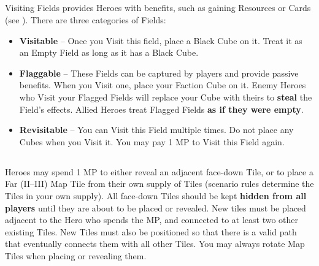 \begin{multicols}{2}

\subsection*{}
Visiting Fields provides Heroes with benefits, such as gaining Resources or Cards (see ).
There are three categories of Fields:
\begin{itemize}
  \item \textbf{Visitable} – Once you Visit this field, place a Black Cube on it.
    Treat it as an Empty Field as long as it has a Black Cube.
  \item \textbf{Flaggable} – These Fields can be captured by players and provide passive benefits.
    When you Visit one, place your Faction Cube on it.
    Enemy Heroes who Visit your Flagged Fields will replace your Cube with theirs to \textbf{steal} the Field’s effects.
    Allied Heroes treat Flagged Fields \textbf{as if they were empty}.
  \item \textbf{Revisitable} – You can Visit this Field multiple times.
    Do not place any Cubes when you Visit it.
    You may pay 1 MP to Visit this Field again.
\end{itemize}

\subsection*{}
Heroes may spend 1 MP to either reveal an adjacent face-down Tile, or to place a Far (II–III) Map Tile from their own supply of Tiles (scenario rules determine the Tiles in your own supply).
All face-down Tiles should be kept \textbf{hidden from all players} until they are about to be placed or revealed.
New tiles must be placed adjacent to the Hero who spends the MP, and connected to at least two other existing Tiles.
New Tiles must also be positioned so that there is a valid path that eventually connects them with all other Tiles.
You may always rotate Map Tiles when placing or revealing them.

\medskip
{}

\end{multicols}

